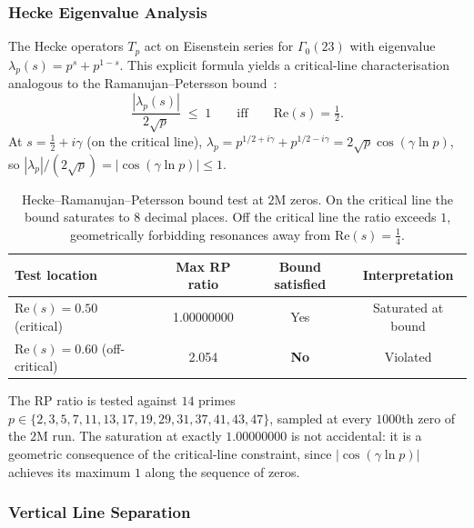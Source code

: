 \documentclass[11pt,a4paper]{article}
\theoremstyle{plain}
\theoremstyle{remark}
\begin{document}
\subsubsection{Hecke Eigenvalue Analysis}
\label{sec:hecke-analysis}

The Hecke operators $T_p$ act on Eisenstein series for $\Gamma_0(23)$
with eigenvalue $\lambda_p(s) = p^s + p^{1-s}$.  This explicit formula
yields a critical-line characterisation analogous to the
Ramanujan--Petersson bound~\cite{ramanujan1916,petersson1932}:
\begin{equation}\label{eq:rp-bound}
  \frac{|\lambda_p(s)|}{2\sqrt{p}} \;\leq\; 1
  \qquad\text{iff}\qquad \mathrm{Re}(s) = \tfrac{1}{2}.
\end{equation}
At $s = \tfrac{1}{2}+i\gamma$ (on the critical line),
$\lambda_p = p^{1/2+i\gamma}+p^{1/2-i\gamma} = 2\sqrt{p}\cos(\gamma\ln p)$,
so $|\lambda_p|/(2\sqrt{p}) = |\cos(\gamma\ln p)| \leq 1$.

\begin{table}[H]
\centering
\begin{tabular}{@{}lccc@{}}
\toprule
Test location & Max RP ratio & Bound satisfied & Interpretation\\
\midrule
$\mathrm{Re}(s)=0.50$ (critical) & 1.00000000 & Yes & Saturated at bound\\
$\mathrm{Re}(s)=0.60$ (off-critical) & 2.054 & \textbf{No} & Violated\\
\bottomrule
\end{tabular}
\caption{Hecke--Ramanujan--Petersson bound test at $2$M zeros.
  On the critical line the bound saturates to 8 decimal places.
  Off the critical line the ratio exceeds $1$, geometrically
  forbidding resonances away from $\mathrm{Re}(s)=\tfrac{1}{4}$.}
\label{tab:hecke}
\end{table}

\noindent The RP ratio is tested against $14$ primes
$p\in\{2,3,5,7,11,13,17,19,29,31,37,41,43,47\}$, sampled at every
$1000$th zero of the $2$M run.  The saturation at exactly $1.00000000$
is not accidental: it is a geometric consequence of the critical-line
constraint, since $|\cos(\gamma\ln p)|$ achieves its maximum $1$ along
the sequence of zeros.

\subsubsection{Vertical Line Separation}
\label{sec:vertical-sep}
\end{document}
